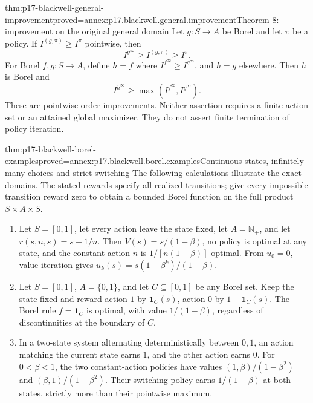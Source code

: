 \begin{hbtheorem}{thm:p17-blackwell-general-improvement}{proved=annex:p17.blackwell.general.improvement}{Theorem 8: improvement on the original general domain}
Let \(g:S\to A\) be Borel and let \(\pi\) be a policy.
If \(I^{(g,\pi)}\geq I^\pi\) pointwise, then
\[
              I^{g^\infty}\geq I^{(g,\pi)}\geq I^\pi.
\]
For Borel \(f,g:S\to A\), define \(h=f\) where
\(I^{f^\infty}\geq I^{g^\infty}\), and \(h=g\) elsewhere.
Then \(h\) is Borel and
\[
              I^{h^\infty}\geq
                      \max(I^{f^\infty},I^{g^\infty}).
\]
These are pointwise order improvements. Neither assertion
requires a finite action set or an attained global maximizer.
They do not assert finite termination of policy iteration.
\end{hbtheorem}

\begin{hbtheorem}{thm:p17-blackwell-borel-examples}{proved=annex:p17.blackwell.borel.examples}{Continuous states, infinitely many choices and strict switching}
The following calculations illustrate the exact domains.
The stated rewards specify all realized transitions; give every
impossible transition reward zero to obtain a bounded Borel
function on the full product \(S\times A\times S\).
\begin{enumerate}
\item Let \(S=[0,1]\), let every action leave the state fixed,
      let \(A=\mathbb N_+\), and let \(r(s,n,s)=s-1/n\).
      Then \(V(s)=s/(1-\beta)\), no policy is optimal at any
      state, and the constant action \(n\) is
      \(1/[n(1-\beta)]\)-optimal. From \(u_0=0\), value iteration
      gives \(u_k(s)=s(1-\beta^k)/(1-\beta)\).
\item Let \(S=[0,1]\), \(A=\{0,1\}\), and let \(C\subseteq[0,1]\)
      be any Borel set. Keep the state fixed and reward action
      \(1\) by \(\mathbf1_C(s)\), action \(0\) by
      \(1-\mathbf1_C(s)\). The Borel rule \(f=\mathbf1_C\)
      is optimal, with value \(1/(1-\beta)\), regardless of
      discontinuities at the boundary of \(C\).
\item In a two-state system alternating deterministically between
      \(0,1\), an action matching the current state earns \(1\),
      and the other action earns \(0\). For \(0<\beta<1\),
      the two constant-action policies have values
      \((1,\beta)/(1-\beta^2)\) and
      \((\beta,1)/(1-\beta^2)\). Their switching policy earns
      \(1/(1-\beta)\) at both states, strictly more than their
      pointwise maximum.
\end{enumerate}
\end{hbtheorem}


